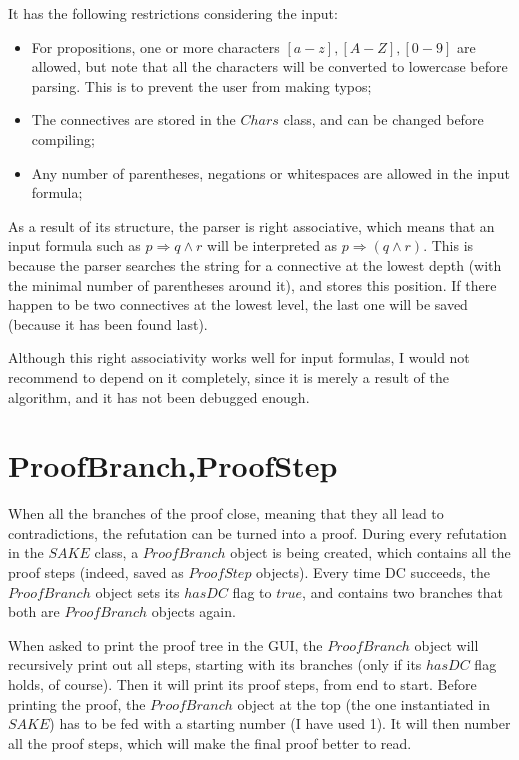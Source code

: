 \documentclass{article}
\begin{document}
It has the following restrictions considering the input:
\begin{itemize}
\item For propositions, one or more characters $[a-z],[A-Z],[0-9]$ are allowed, but note that all the characters will be converted to lowercase before parsing. This is to prevent the user from making typos;
\item The connectives are stored in the $Chars$ class, and can be changed before compiling;
\item Any number of parentheses, negations or whitespaces are allowed in the input formula;
\end{itemize}
As a result of its structure, the parser is right associative, which means that an input formula such as $p\Rightarrow q\wedge r$ will be interpreted as $p\Rightarrow (q\wedge r)$. This is because the parser searches the string for a connective at the lowest depth (with the minimal number of parentheses around it), and stores this position. If there happen to be two connectives at the lowest level, the last one will be saved (because it has been found last).

Although this right associativity works well for input formulas, I would not recommend to depend on it completely, since it is merely a result of the algorithm, and it has not been debugged enough.

\section{ProofBranch,ProofStep}
When all the branches of the proof close, meaning that they all lead to contradictions, the refutation can be turned into a proof. During every refutation in the $SAKE$ class, a $ProofBranch$ object is being created, which contains all the proof steps (indeed, saved as $ProofStep$ objects). Every time DC succeeds, the $ProofBranch$ object sets its $hasDC$ flag to $true$, and contains two branches that both are $ProofBranch$ objects again.

When asked to print the proof tree in the GUI, the $ProofBranch$ object will recursively print out all steps, starting with its branches (only if its $hasDC$ flag holds, of course). Then it will print its proof steps, from end to start. Before printing the proof, the $ProofBranch$ object at the top (the one instantiated in $SAKE$) has to be fed with a starting number (I have used 1). It will then number all the proof steps, which will make the final proof better to read.
\end{document}
